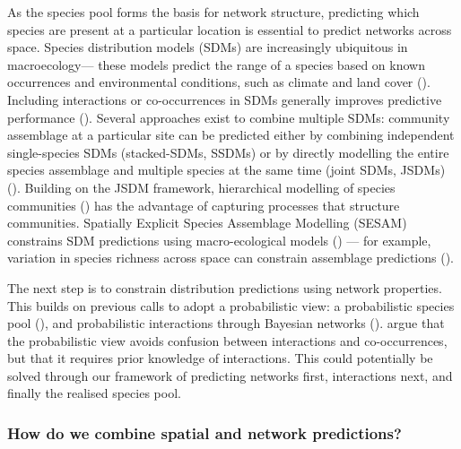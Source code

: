 \begin{refsection}
As the species pool forms the basis for network structure, predicting
which species are present at a particular location is essential to
predict networks across space. Species distribution models (SDMs) are
increasingly ubiquitous in macroecology--- these models predict the
range of a species based on known occurrences and environmental
conditions, such as climate and land cover (\cite{Guisan2005PreSpe,
Elith2006NovMet}). Including interactions or co-occurrences in SDMs
generally improves predictive performance (\cite{Wisz2013RolBio}). Several
approaches exist to combine multiple SDMs: community assemblage at a
particular site can be predicted either by combining independent
single-species SDMs (stacked-SDMs, SSDMs) or by directly modelling the
entire species assemblage and multiple species at the same time (joint
SDMs, JSDMs) (\cite{Norberg2019ComEva}). Building on the JSDM framework,
hierarchical modelling of species communities
(\cite{Ovaskainen2017HowMak}) has the advantage of capturing processes
that structure communities. Spatially Explicit Species Assemblage
Modelling (SESAM) constrains SDM predictions using macro-ecological
models (\cite{Guisan2011SesNew}) --- for example, variation in species
richness across space can constrain assemblage predictions
(\cite{DAmen2015UsiSpe}).

The next step is to constrain distribution predictions using network
properties. This builds on previous calls to adopt a probabilistic view:
a probabilistic species pool (\cite{Karger2016DelPro}), and probabilistic
interactions through Bayesian networks (\cite{Staniczenko2017LinMac}).
\cite{Blanchet2020Cooccurrence} argue that the probabilistic view avoids confusion
between interactions and co-occurrences, but that it requires prior
knowledge of interactions. This could potentially be solved through our
framework of predicting networks first, interactions next, and finally
the realised species pool.

\subsubsection{How do we combine spatial and network
predictions?}\label{how-do-we-combine-spatial-and-network-predictions}


\end{refsection}
